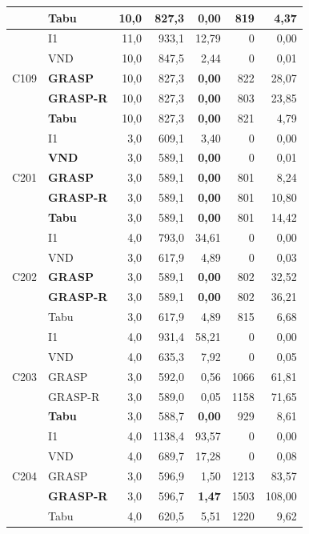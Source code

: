 {\begin{longtable}{llrrrrr}
  & \textbf{Tabu} & 10,0 & 827,3 & \textbf{0,00} & 819 & 4,37 \\
\midrule
\multirow{5}{*}{C109}
  & I1 & 11,0 & 933,1 & 12,79 & 0 & 0,00 \\
  & VND & 10,0 & 847,5 & 2,44 & 0 & 0,01 \\
  & \textbf{GRASP} & 10,0 & 827,3 & \textbf{0,00} & 822 & 28,07 \\
  & \textbf{GRASP-R} & 10,0 & 827,3 & \textbf{0,00} & 803 & 23,85 \\
  & \textbf{Tabu} & 10,0 & 827,3 & \textbf{0,00} & 821 & 4,79 \\
\midrule
\multirow{5}{*}{C201}
  & I1 & 3,0 & 609,1 & 3,40 & 0 & 0,00 \\
  & \textbf{VND} & 3,0 & 589,1 & \textbf{0,00} & 0 & 0,01 \\
  & \textbf{GRASP} & 3,0 & 589,1 & \textbf{0,00} & 801 & 8,24 \\
  & \textbf{GRASP-R} & 3,0 & 589,1 & \textbf{0,00} & 801 & 10,80 \\
  & \textbf{Tabu} & 3,0 & 589,1 & \textbf{0,00} & 801 & 14,42 \\
\midrule
\multirow{5}{*}{C202}
  & I1 & 4,0 & 793,0 & 34,61 & 0 & 0,00 \\
  & VND & 3,0 & 617,9 & 4,89 & 0 & 0,03 \\
  & \textbf{GRASP} & 3,0 & 589,1 & \textbf{0,00} & 802 & 32,52 \\
  & \textbf{GRASP-R} & 3,0 & 589,1 & \textbf{0,00} & 802 & 36,21 \\
  & Tabu & 3,0 & 617,9 & 4,89 & 815 & 6,68 \\
\midrule
\multirow{5}{*}{C203}
  & I1 & 4,0 & 931,4 & 58,21 & 0 & 0,00 \\
  & VND & 4,0 & 635,3 & 7,92 & 0 & 0,05 \\
  & GRASP & 3,0 & 592,0 & 0,56 & 1066 & 61,81 \\
  & GRASP-R & 3,0 & 589,0 & 0,05 & 1158 & 71,65 \\
  & \textbf{Tabu} & 3,0 & 588,7 & \textbf{0,00} & 929 & 8,61 \\
\midrule
\multirow{5}{*}{C204}
  & I1 & 4,0 & 1138,4 & 93,57 & 0 & 0,00 \\
  & VND & 4,0 & 689,7 & 17,28 & 0 & 0,08 \\
  & GRASP & 3,0 & 596,9 & 1,50 & 1213 & 83,57 \\
  & \textbf{GRASP-R} & 3,0 & 596,7 & \textbf{1,47} & 1503 & 108,00 \\
  & Tabu & 4,0 & 620,5 & 5,51 & 1220 & 9,62 \\

\end{longtable}}

